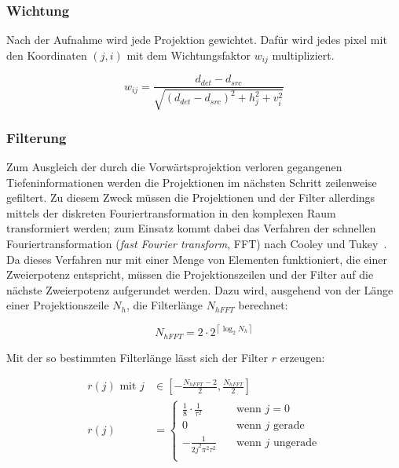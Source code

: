 \subsubsection{Wichtung}\label{sssec:fdk_wichtung}

Nach der Aufnahme wird jede Projektion gewichtet. Dafür wird jedes \gls{pixel} mit den Koordinaten $(j, i)$ mit dem
Wichtungsfaktor $w_{ij}$ multipliziert.

\begin{equation}\label{eq:wichtung}
    w_{ij} = \frac{d_{det} - d_{src}}{\sqrt{(d_{det} - d_{src})^2 + h_j^2 + v_i^2}}
\end{equation}

\subsubsection{Filterung}

Zum Ausgleich der durch die Vorwärtsprojektion verloren gegangenen Tiefeninformationen werden die Projektionen im
nächsten Schritt zeilenweise gefiltert. Zu diesem Zweck müssen die Projektionen und der Filter allerdings mittels der
diskreten Fouriertransformation in den komplexen Raum transformiert werden; zum Einsatz kommt dabei das Verfahren der
schnellen Fouriertransformation (\textit{fast Fourier transform}, FFT) nach Cooley und Tukey~\cite{cooltuk}. Da dieses
Verfahren nur mit einer Menge von Elementen funktioniert, die einer Zweierpotenz entspricht, müssen die
Projektionszeilen und der Filter auf die nächste Zweierpotenz {\glqq}aufgerundet{\grqq} werden. Dazu wird, ausgehend von
der Länge einer Projektionszeile $N_h$,  die Filterlänge $N_{hFFT}$ berechnet:

\begin{equation}
    N_{hFFT} = 2 \cdot 2^{\left\lceil \log_{2} N_h \right\rceil}
\end{equation}

Mit der so bestimmten Filterlänge lässt sich der Filter $r$ erzeugen:

\begin{equation}
    \begin{aligned}
        r(j) \text{ mit } j &\in \left[-\frac{N_{hFFT} - 2}{2}, \frac{N_{hFFT}}{2}\right]\\
        r(j) &=
            \begin{cases}
                \frac{1}{8} \cdot \frac{1}{\tau^2} & \quad \text{wenn } j = 0\\
                0 & \quad \text{wenn } j \text{ gerade}\\
                -\frac{1}{2j^2\pi^2\tau^2} & \quad \text{wenn } j \text{ ungerade}\\
            \end{cases}
    \end{aligned}
\end{equation}

